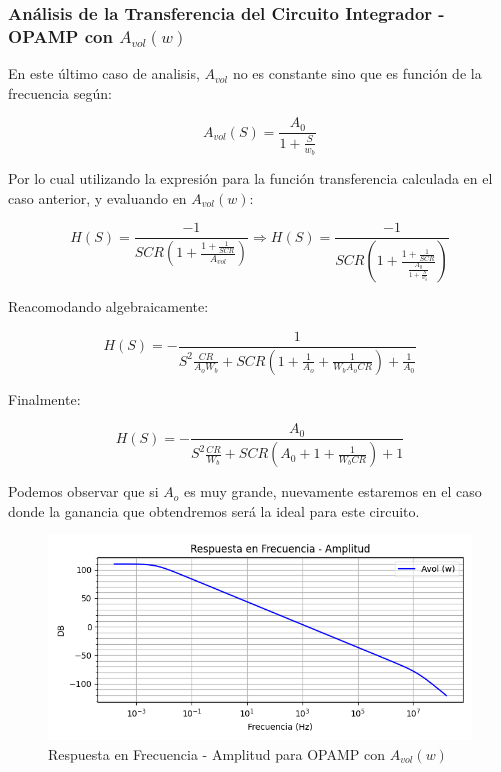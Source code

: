 \subsubsection{Análisis de la Transferencia del Circuito Integrador - OPAMP con $A_{vol}(w)$}

En este último caso de analisis, $A_{vol}$ no es constante sino que es función de la frecuencia según:

$$A_{vol}(S)=\frac{A_0}{1+\frac{S}{w_b}}$$

Por lo cual utilizando la expresión para la función transferencia calculada en el caso anterior, y evaluando en $A_{vol}(w)$:

$$H(S)= \frac{-1}{SCR(1+\frac{1+\frac{1}{SCR}}{A_{vol}})}\Longrightarrow H(S)= \frac{-1}{SCR(1+\frac{1+\frac{1}{SCR}}{\frac{A_0}{1+\frac{S}{w_b}}})}$$ 

Reacomodando algebraicamente:

$$H(S)=- \frac{1}{S^2\frac{CR}{A_oW_b}+SCR(1 + \frac{1}{A_o}+\frac{1}{W_bA_oCR}) + \frac{1}{A_0}}$$

Finalmente:

$$H(S)=- \frac{{A_0}}{S^2\frac{CR}{W_b}+SCR({A_0} + 1+\frac{1}{W_bCR}) + 1 }$$

Podemos observar que si $A_o$ es muy grande, nuevamente estaremos en el caso donde la ganancia que obtendremos será la ideal para este circuito.

\begin{figure}[H]
    \centering 
    \includegraphics [scale=0.6] {../Ejercicio3-CircuitoIntegradoresyDerivadores/Imagenes/teorico-avol-w-integrador-amplitud.png} 
    \caption{Respuesta en Frecuencia - Amplitud para OPAMP con $A_{vol}(w)$}
    \label{fig:emptyPlotTool}
\end{figure}

